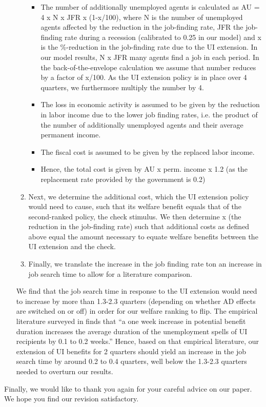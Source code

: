 \documentclass[12pt,letterpaper,english]{article}
\begin{document}
\begin{itemize}
\begin{enumerate}
		\begin{itemize}
			
			\item The number of additionally unemployed agents is calculated as AU = 4 x N x JFR x (1-x/100), where N is the number of unemployed agents affected by the reduction in the job-finding rate, JFR the job-finding rate during a recession (calibrated to 0.25 in our model) and x is the \%-reduction in the job-finding rate due to the UI extension. In our model results, N x JFR many agents find a job in each period. In the back-of-the-envelope calculation we assume that number reduces by a factor of x/100. As the UI extension policy is in place over 4 quarters, we furthermore multiply the number by 4.
			
			\item The loss in economic activity is assumed to be given by the reduction in labor income due to the lower job finding rates, i.e. the product of the number of additionally unemployed agents and their average permanent income.
			
			\item The fiscal cost is assumed to be given by the replaced labor income.
			
			\item Hence, the total cost is given by AU x perm. income x 1.2 (as the replacement rate provided by the government is 0.2)
			
		\end{itemize}
		
		\item Next, we determine the additional cost, which the UI extension policy would need to cause, such that its welfare benefit equals that of the second-ranked policy, the check stimulus. We then determine x (the reduction in the job-finding rate) such that additional costs as defined above equal the amount necessary to equate welfare benefits between the UI extension and the check.
		
		\item Finally, we translate the increase in the job finding rate ton an increase in job search time to allow for a literature comparison.
		
	\end{enumerate}
	
	
	We find that the job search time in response to the UI extension would need to increase by more than 1.3-2.3 quarters (depending on whether AD effects are switched on or off) in order for our welfare ranking to flip. The empirical literature surveyed in \citet{hagedorn2019unemployment} finds that “a one week increase in potential benefit duration increases the average duration of the unemployment spells of UI recipients by 0.1 to 0.2 weeks.” Hence, based on that empirical literature, our extension of UI benefits for 2 quarters should yield an increase in the job search time by around 0.2 to 0.4 quarters, well below the 1.3-2.3 quarters needed to overturn our results.
	
\end{itemize}

\bigskip

\noindent Finally, we would like to thank you again for your careful advice on our paper. We hope you find our revision satisfactory.



\end{document}
